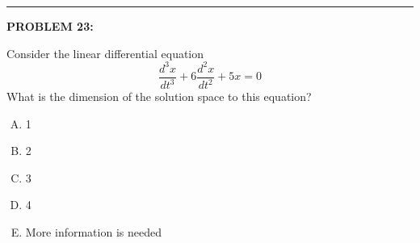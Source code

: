 \documentclass[12pt]{amsart}
\newcommand{\divider}{
  \vspace{-1em} %
  \noindent
  \raisebox{-0.15ex}{\textbullet}%
  \hspace{0.5em}%
  \rule[0.5ex]{0.95\textwidth}{1.0pt}%
  \hspace{0.5em}%
  \raisebox{-0.15ex}{\textbullet}%
  \vspace{0em} %
}
\begin{document}

\divider

{\bf PROBLEM 23:}

Consider the linear differential equation
$$\frac{d^3x}{dt^3} + 6\frac{d^2x}{dt^2} + 5x = 0$$
What is the dimension of the solution space to this equation?

\begin{enumerate}[(A)]
\item 1
\item 2
\item 3
\item 4
\item More information is needed
\end{enumerate}
\end{document}
